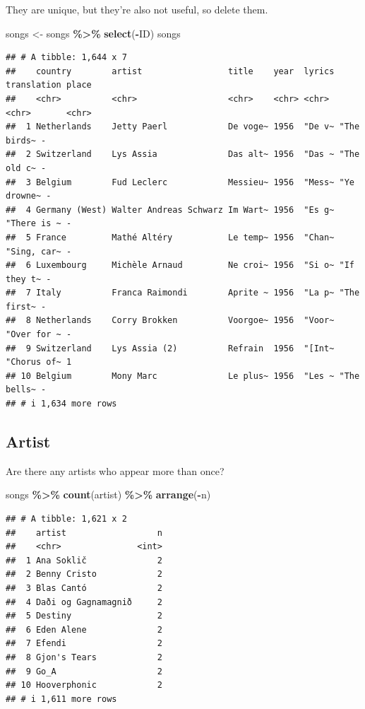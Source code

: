 \documentclass[
]{article}
\newenvironment{Shaded}{\begin{snugshade}}{\end{snugshade}}
\newcommand{\FunctionTok}[1]{\textcolor[rgb]{0.13,0.29,0.53}{\textbf{#1}}}
\newcommand{\NormalTok}[1]{#1}
\newcommand{\OtherTok}[1]{\textcolor[rgb]{0.56,0.35,0.01}{#1}}
\newcommand{\SpecialCharTok}[1]{\textcolor[rgb]{0.81,0.36,0.00}{\textbf{#1}}}
\begin{document}
They are unique, but they're also not useful, so delete them.

\begin{Shaded}
\begin{Highlighting}[]
\NormalTok{songs }\OtherTok{\textless{}{-}} 
\NormalTok{  songs }\SpecialCharTok{\%\textgreater{}\%} 
  \FunctionTok{select}\NormalTok{(}\SpecialCharTok{{-}}\NormalTok{ID)}
\NormalTok{songs}
\end{Highlighting}
\end{Shaded}

\begin{verbatim}
## # A tibble: 1,644 x 7
##    country        artist                 title    year  lyrics translation place
##    <chr>          <chr>                  <chr>    <chr> <chr>  <chr>       <chr>
##  1 Netherlands    Jetty Paerl            De voge~ 1956  "De v~ "The birds~ -    
##  2 Switzerland    Lys Assia              Das alt~ 1956  "Das ~ "The old c~ -    
##  3 Belgium        Fud Leclerc            Messieu~ 1956  "Mess~ "Ye drowne~ -    
##  4 Germany (West) Walter Andreas Schwarz Im Wart~ 1956  "Es g~ "There is ~ -    
##  5 France         Mathé Altéry           Le temp~ 1956  "Chan~ "Sing, car~ -    
##  6 Luxembourg     Michèle Arnaud         Ne croi~ 1956  "Si o~ "If they t~ -    
##  7 Italy          Franca Raimondi        Aprite ~ 1956  "La p~ "The first~ -    
##  8 Netherlands    Corry Brokken          Voorgoe~ 1956  "Voor~ "Over for ~ -    
##  9 Switzerland    Lys Assia (2)          Refrain  1956  "[Int~ "Chorus of~ 1    
## 10 Belgium        Mony Marc              Le plus~ 1956  "Les ~ "The bells~ -    
## # i 1,634 more rows
\end{verbatim}

\subsection{Artist}\label{artist}

Are there any artists who appear more than once?

\begin{Shaded}
\begin{Highlighting}[]
\NormalTok{songs }\SpecialCharTok{\%\textgreater{}\%} 
  \FunctionTok{count}\NormalTok{(artist) }\SpecialCharTok{\%\textgreater{}\%}
  \FunctionTok{arrange}\NormalTok{(}\SpecialCharTok{{-}}\NormalTok{n)}
\end{Highlighting}
\end{Shaded}

\begin{verbatim}
## # A tibble: 1,621 x 2
##    artist                  n
##    <chr>               <int>
##  1 Ana Soklič              2
##  2 Benny Cristo            2
##  3 Blas Cantó              2
##  4 Daði og Gagnamagnið     2
##  5 Destiny                 2
##  6 Eden Alene              2
##  7 Efendi                  2
##  8 Gjon's Tears            2
##  9 Go_A                    2
## 10 Hooverphonic            2
## # i 1,611 more rows
\end{verbatim}
\end{document}
